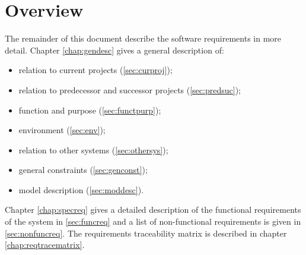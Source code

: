 \section{Overview}
The remainder of this document describe the software requirements in more detail. Chapter \ref{chap:gendesc} gives a general description of:
\begin{itemize}
\item relation to current projects (\ref{sec:curproj});
\item relation to predecessor and successor projects (\ref{sec:predsuc});
\item function and purpose (\ref{sec:functpurp});
\item environment (\ref{sec:env});
\item relation to other systems (\ref{sec:othersys});
\item general constraints (\ref{sec:genconst});
\item model description (\ref{sec:moddesc}).
\end{itemize}
Chapter \ref{chap:specreq} gives a detailed description of the functional requirements of the system in \ref{sec:funcreq} and a list of non-functional requirements is given in \ref{sec:nonfuncreq}. The requirements traceability matrix is described in chapter \ref{chap:reqtracematrix}.
